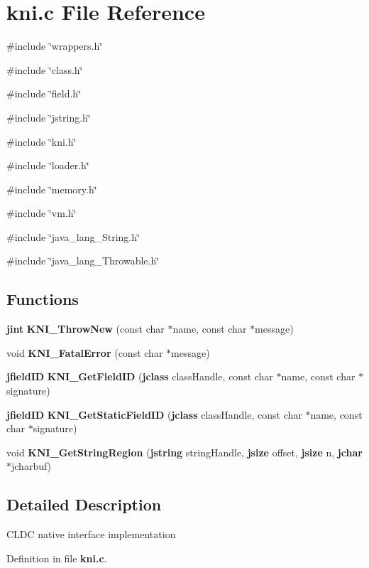 \section{kni.c File Reference}
\label{kni_8c}
{\ttfamily \#include \char`\"{}wrappers.h\char`\"{}}\par
{\ttfamily \#include \char`\"{}class.h\char`\"{}}\par
{\ttfamily \#include \char`\"{}field.h\char`\"{}}\par
{\ttfamily \#include \char`\"{}jstring.h\char`\"{}}\par
{\ttfamily \#include \char`\"{}kni.h\char`\"{}}\par
{\ttfamily \#include \char`\"{}loader.h\char`\"{}}\par
{\ttfamily \#include \char`\"{}memory.h\char`\"{}}\par
{\ttfamily \#include \char`\"{}vm.h\char`\"{}}\par
{\ttfamily \#include \char`\"{}java\_\-lang\_\-String.h\char`\"{}}\par
{\ttfamily \#include \char`\"{}java\_\-lang\_\-Throwable.h\char`\"{}}\par
\subsection*{Functions}
\begin{DoxyCompactItemize}
\item 
{\bf jint} {\bf KNI\_\-ThrowNew} (const char $\ast$name, const char $\ast$message)
\item 
void {\bf KNI\_\-FatalError} (const char $\ast$message)
\item 
{\bf jfieldID} {\bf KNI\_\-GetFieldID} ({\bf jclass} classHandle, const char $\ast$name, const char $\ast$signature)
\item 
{\bf jfieldID} {\bf KNI\_\-GetStaticFieldID} ({\bf jclass} classHandle, const char $\ast$name, const char $\ast$signature)
\item 
void {\bf KNI\_\-GetStringRegion} ({\bf jstring} stringHandle, {\bf jsize} offset, {\bf jsize} n, {\bf jchar} $\ast$jcharbuf)
\end{DoxyCompactItemize}


\subsection{Detailed Description}
CLDC native interface implementation 

Definition in file {\bf kni.c}.



